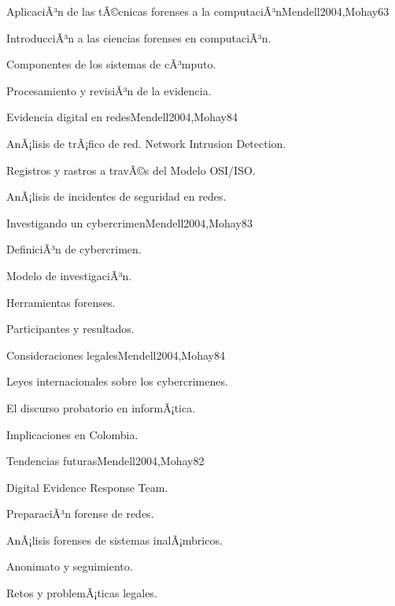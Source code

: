 \begin{syllabus}
\begin{unit}{AplicaciÃ³n de las tÃ©cnicas forenses a la computaciÃ³n}{Mendell2004,Mohay}{6}{3}
\begin{topics}
      \item {IntroducciÃ³n a las ciencias forenses en computaciÃ³n.}
      \item {Componentes de los sistemas de cÃ³mputo.}
      \item {Procesamiento y revisiÃ³n de la evidencia.}
\end{topics}
\end{unit}

\begin{unit}{Evidencia digital en redes}{Mendell2004,Mohay}{8}{4}
\begin{topics}
      \item {AnÃ¡lisis de trÃ¡fico de red. Network Intrusion Detection.}
      \item {Registros y rastros a travÃ©s del Modelo OSI/ISO.}
      \item {AnÃ¡lisis de incidentes de seguridad en redes.}
\end{topics}
\end{unit}

\begin{unit}{Investigando un cybercrimen}{Mendell2004,Mohay}{8}{3}
\begin{topics}
      \item {DefiniciÃ³n de cybercrimen.}
      \item {Modelo de investigaciÃ³n.}
      \item {Herramientas forenses.}
      \item {Participantes y resultados.}
\end{topics}
\end{unit}

\begin{unit}{Consideraciones legales}{Mendell2004,Mohay}{8}{4}
\begin{topics}
      \item {Leyes internacionales sobre los cybercrimenes.}
      \item {El discurso probatorio en informÃ¡tica.}
      \item {Implicaciones en Colombia.}
\end{topics}
\end{unit}

\begin{unit}{Tendencias futuras}{Mendell2004,Mohay}{8}{2}
\begin{topics}
      \item {Digital Evidence Response Team.}
      \item {PreparaciÃ³n forense de redes.}
      \item {AnÃ¡lisis forenses de sistemas inalÃ¡mbricos.}
      \item {Anonimato y seguimiento.}
      \item {Retos y problemÃ¡ticas legales.}
\end{topics}
\end{unit}

\begin{coursebibliography}
\end{coursebibliography}

\end{syllabus}

%
